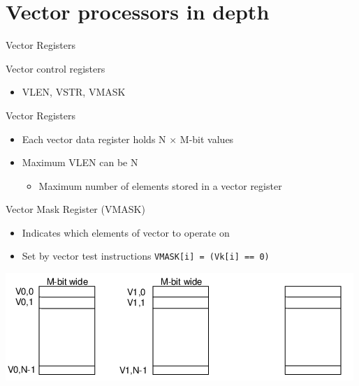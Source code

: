 \documentclass[presentation]{beamer}
\begin{document}
\section*{Vector processors in depth}
\label{sec:orga189fda}

\begin{frame}[label={sec:orga6e2540}]{Vector Registers}
\begin{block}{Vector control registers}
\begin{itemize}
\item \small VLEN, VSTR, VMASK
\end{itemize}
\end{block}

\begin{block}{Vector Registers}
\begin{itemize}
\item \small Each vector data register holds N \(\times\) M-bit values
\item \small Maximum VLEN can be N
\begin{itemize}
\item Maximum number of elements stored in a vector register
\end{itemize}
\end{itemize}
\end{block}

\begin{block}{Vector Mask Register (VMASK)}
\begin{itemize}
\item \small Indicates which elements of vector to operate on
\item \small Set by vector test instructions  \texttt{VMASK[i] = (Vk[i] == 0)}
\vspace*{-1em}
\end{itemize}

\begin{center}
\includegraphics[width=.85\textwidth]{./images/slides_SIMD_28_small.png}
\end{center}
\end{block}
\end{frame}
\end{document}
